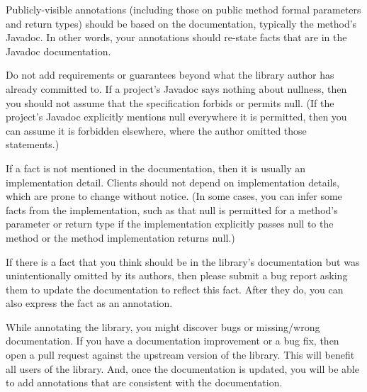 
Publicly-visible annotations (including those on public method formal
parameters and return types) should be based on the
documentation, typically the method's Javadoc.
In other words, your annotations should re-state facts that are in the Javadoc
documentation.

Do not add requirements or guarantees beyond what the library author has
already committed to.  If a project's Javadoc says nothing about nullness,
then you should not assume that the specification forbids or permits null.
(If the project's Javadoc explicitly mentions null everywhere it is permitted,
then you can assume it is forbidden elsewhere, where the author omitted those
statements.)

If a fact is not mentioned in the documentation, then it is usually an
implementation detail.  Clients should not depend on implementation
details, which are prone to change without notice.
(In some cases, you can infer some facts from the
implementation, such as that null is permitted for a method's parameter or
return type if the implementation explicitly passes null to the method or
the method implementation returns null.)

If there is a fact that you think should be in the library's documentation
but was unintentionally omitted by its authors, then please submit a bug
report asking them to update the documentation to reflect this fact.  After
they do, you can also express the fact as an annotation.




While annotating the library, you might discover bugs or missing/wrong
documentation.  If you have a documentation improvement or a bug fix, then
open a pull request against the upstream version of the library.  This will
benefit all users of the library.  And, once the documentation is updated,
you will be able to add annotations that are consistent with the
documentation.



